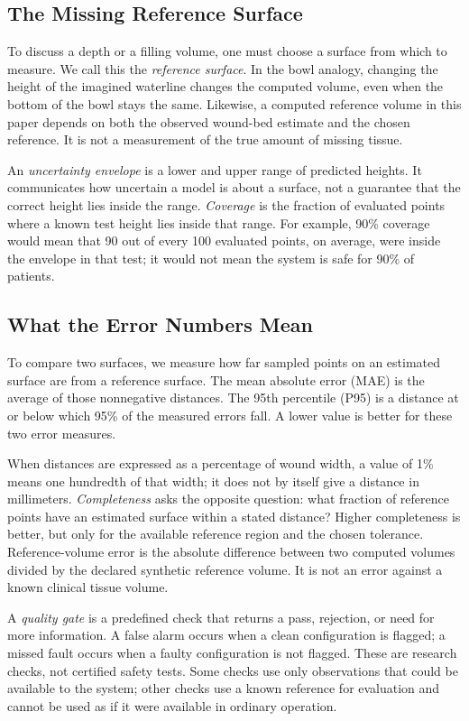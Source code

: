 \documentclass[conference]{IEEEtran}
\begin{document}
\subsection{The Missing Reference Surface}

To discuss a depth or a filling volume, one must choose a surface from which
to measure. We call this the \emph{reference surface}. In the bowl analogy,
changing the height of the imagined waterline changes the computed volume,
even when the bottom of the bowl stays the same. Likewise, a computed
reference volume in this paper depends on both the observed wound-bed
estimate and the chosen reference. It is not a measurement of the true
amount of missing tissue.

An \emph{uncertainty envelope} is a lower and upper range of predicted
heights. It communicates how uncertain a model is about a surface, not a
guarantee that the correct height lies inside the range. \emph{Coverage}
is the fraction of evaluated points where a known test height lies inside
that range. For example, 90\% coverage would mean that 90 out of every 100
evaluated points, on average, were inside the envelope in that test; it
would not mean the system is safe for 90\% of patients.

\subsection{What the Error Numbers Mean}

To compare two surfaces, we measure how far sampled points on an estimated
surface are from a reference surface. The mean absolute error (MAE) is the
average of those nonnegative distances. The 95th percentile (P95) is a
distance at or below which 95\% of the measured errors fall. A lower value
is better for these two error measures.

When distances are expressed as a percentage of wound width, a value of 1\%
means one hundredth of that width; it does not by itself give a distance in
millimeters. \emph{Completeness} asks the opposite question: what fraction
of reference points have an estimated surface within a stated distance?
Higher completeness is better, but only for the available reference region
and the chosen tolerance. Reference-volume error is the absolute difference
between two computed volumes divided by the declared synthetic reference
volume. It is not an error against a known clinical tissue volume.

A \emph{quality gate} is a predefined check that returns a pass, rejection,
or need for more information. A false alarm occurs when a clean configuration
is flagged; a missed fault occurs when a faulty configuration is not flagged.
These are research checks, not certified safety tests. Some checks use only
observations that could be available to the system; other checks use a known
reference for evaluation and cannot be used as if it were available in
ordinary operation.
\end{document}
